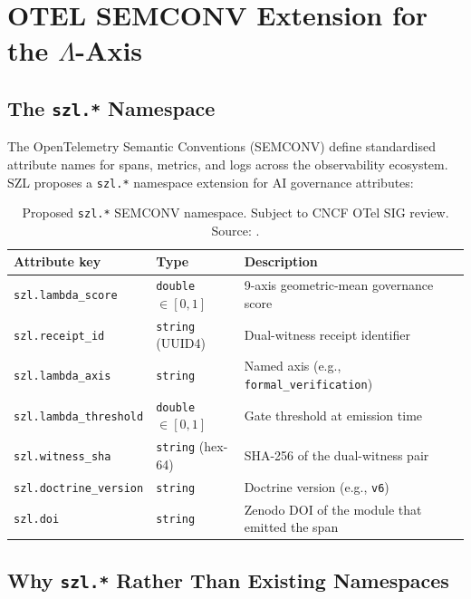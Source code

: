 \section{OTEL SEMCONV Extension for the $\Lambda$-Axis}
\label{sec:otel-semconv}

\subsection{The \texttt{szl.*} Namespace}
\label{ssec:szl-namespace}

The OpenTelemetry Semantic Conventions (SEMCONV) define standardised attribute
names for spans, metrics, and logs across the observability ecosystem.  SZL
proposes a \texttt{szl.*} namespace extension for AI governance attributes:

\begin{table}[ht]
\centering
\begin{tabular}{lll}
\textbf{Attribute key} & \textbf{Type} & \textbf{Description} \\
\hline
\texttt{szl.lambda\_score} & \texttt{double} $\in [0,1]$ & 9-axis geometric-mean governance score \\
\texttt{szl.receipt\_id} & \texttt{string} (UUID4) & Dual-witness receipt identifier \\
\texttt{szl.lambda\_axis} & \texttt{string} & Named axis (e.g., \texttt{formal\_verification}) \\
\texttt{szl.lambda\_threshold} & \texttt{double} $\in [0,1]$ & Gate threshold at emission time \\
\texttt{szl.witness\_sha} & \texttt{string} (hex-64) & SHA-256 of the dual-witness pair \\
\texttt{szl.doctrine\_version} & \texttt{string} & Doctrine version (e.g., \texttt{v6}) \\
\texttt{szl.doi} & \texttt{string} & Zenodo DOI of the module that emitted the span \\
\end{tabular}
\caption{Proposed \texttt{szl.*} SEMCONV namespace.  Subject to CNCF
  OTel SIG review.  Source: \cite{szl_observability_graft}.}
\label{tab:semconv}
\end{table}

\subsection{Why \texttt{szl.*} Rather Than Existing Namespaces}
\label{ssec:semconv-rationale}

